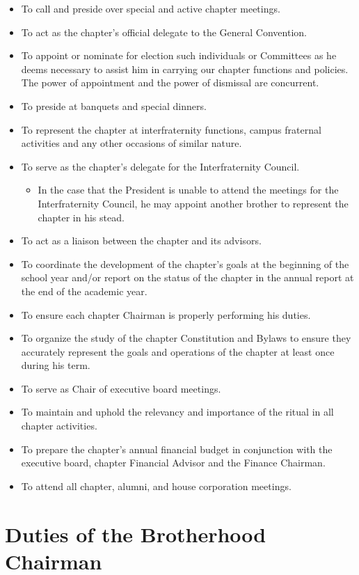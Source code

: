 \begin{itemize}
\item To call and preside over special and active chapter meetings.
\item To act as the chapter’s official delegate to the General Convention.
\item To appoint or nominate for election such individuals or Committees as he
deems necessary to assist him in carrying our chapter functions and policies.
The power of appointment and the power of dismissal are concurrent.
\item To preside at banquets and special dinners.
\item To represent the chapter at interfraternity functions, campus fraternal
activities and any other occasions of similar nature.
\item To serve as the chapter’s delegate for the Interfraternity Council.
\begin{itemize}
\item In the case that the President is unable to attend the meetings for the
Interfraternity Council, he may appoint another brother to represent the
chapter in his stead.
\end{itemize}
\item To act as a liaison between the chapter and its advisors.
\item To coordinate the development of the chapter’s goals at the beginning of
the school year and/or report on the status of the chapter in the annual report
at the end of the academic year.
\item To ensure each chapter Chairman is properly performing his duties.
\item To organize the study of the chapter Constitution and Bylaws to ensure
they accurately represent the goals and operations of the chapter at least once
during his term.
\item To serve as Chair of executive board meetings.
\item To maintain and uphold the relevancy and importance of the ritual in all
chapter activities.
\item To prepare the chapter’s annual financial budget in conjunction with the
executive board, chapter Financial Advisor and the Finance Chairman.
\item To attend all chapter, alumni, and house corporation meetings.
\end{itemize}

\section{Duties of the Brotherhood Chairman}
\label{sec:duties-of-the-brotherhood-chairman}

